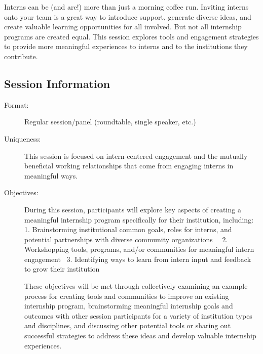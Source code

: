 \documentclass{report}
\begin{document}
              Interns can be (and are!) more than just a morning coffee run. Inviting interns onto your team is a great way to introduce support, generate diverse ideas, and create valuable learning opportunities for all involved. But not all internship programs are created equal. This session explores tools and engagement strategies to provide more meaningful experiences to interns and to the institutions they contribute.

              \subsection*{Session Information}
                \begin{description}
                  \item [Format:] Regular session/panel (roundtable, single speaker, etc.)
							    
							    \item [Uniqueness:]This session is focused on intern-centered engagement and the mutually beneficial working relationships that come from engaging interns in meaningful ways.
							    \item [Objectives:]During this session, participants will explore key aspects of creating a meaningful internship program specifically for their institution, including: 
1. Brainstorming institutional common goals, roles for interns, and potential partnerships with diverse community organizations  
2. Workshopping tools, programs, and/or communities for meaningful intern engagement 
3. Identifying ways to learn from intern input and feedback to grow their institution

These objectives will be met through collectively examining an example process for creating tools and communities to improve an existing internship program, brainstorming meaningful internship goals and outcomes with other session participants for a variety of institution types and disciplines, and discussing other potential tools or sharing out successful strategies to address these ideas and develop valuable internship experiences.


\end{description}
\end{document}
